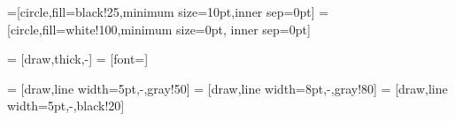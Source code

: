 
\def\scale{0.85}
\def\upperlist{{(0, 8)/a}, {(1.5, 8)/b}, {(1, 6)/c}, {(2.5, 6)/d}}
\def\lowerlist{{(4.5, 3)/e}, {(7, 3)/f}, {(3, 1)/g}, {(6, 1)/h}}
\def\uppercon{a/b, a/c, c/b, c/d, b/d}
\def\lowercon{e/f, e/g, e/h, g/h, f/h}



=[circle,fill=black!25,minimum size=10pt,inner sep=0pt]
=[circle,fill=white!100,minimum size=0pt, inner sep=0pt]

 = [draw,thick,-]
 = [font=\small]

 = [draw,line width=5pt,-,gray!50]
 = [draw,line width=8pt,-,gray!80]
 = [draw,line width=5pt,-,black!20]

